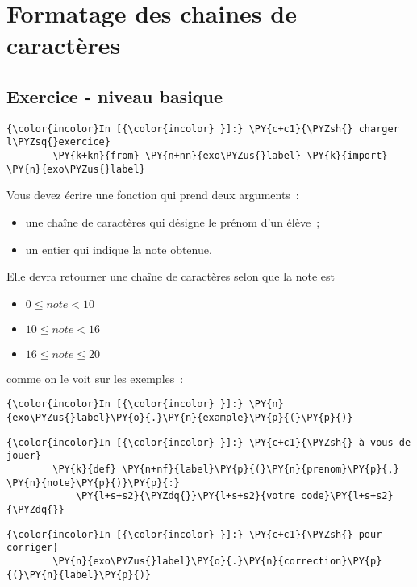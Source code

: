    \hypertarget{formatage-des-chaines-de-caractuxe8res}{%
\section{Formatage des chaines de
caractères}\label{formatage-des-chaines-de-caractuxe8res}}

    \hypertarget{exercice---niveau-basique}{%
\subsection{Exercice - niveau basique}\label{exercice---niveau-basique}}

    \begin{Verbatim}[commandchars=\\\{\}]
{\color{incolor}In [{\color{incolor} }]:} \PY{c+c1}{\PYZsh{} charger l\PYZsq{}exercice}
        \PY{k+kn}{from} \PY{n+nn}{exo\PYZus{}label} \PY{k}{import} \PY{n}{exo\PYZus{}label}
\end{Verbatim}


    Vous devez écrire une fonction qui prend deux arguments~:

\begin{itemize}
\tightlist
\item
  une chaîne de caractères qui désigne le prénom d'un élève~;
\item
  un entier qui indique la note obtenue.
\end{itemize}

Elle devra retourner une chaîne de caractères selon que la note est

\begin{itemize}
\tightlist
\item
  \(0 \leqslant note \lt 10\)
\item
  \(10 \leqslant note \lt 16\)
\item
  \(16 \leqslant note \leqslant 20\)
\end{itemize}

comme on le voit sur les exemples~:

    \begin{Verbatim}[commandchars=\\\{\}]
{\color{incolor}In [{\color{incolor} }]:} \PY{n}{exo\PYZus{}label}\PY{o}{.}\PY{n}{example}\PY{p}{(}\PY{p}{)}
\end{Verbatim}


    \begin{Verbatim}[commandchars=\\\{\}]
{\color{incolor}In [{\color{incolor} }]:} \PY{c+c1}{\PYZsh{} à vous de jouer}
        \PY{k}{def} \PY{n+nf}{label}\PY{p}{(}\PY{n}{prenom}\PY{p}{,} \PY{n}{note}\PY{p}{)}\PY{p}{:}
            \PY{l+s+s2}{\PYZdq{}}\PY{l+s+s2}{votre code}\PY{l+s+s2}{\PYZdq{}}
\end{Verbatim}


    \begin{Verbatim}[commandchars=\\\{\}]
{\color{incolor}In [{\color{incolor} }]:} \PY{c+c1}{\PYZsh{} pour corriger}
        \PY{n}{exo\PYZus{}label}\PY{o}{.}\PY{n}{correction}\PY{p}{(}\PY{n}{label}\PY{p}{)}
\end{Verbatim}